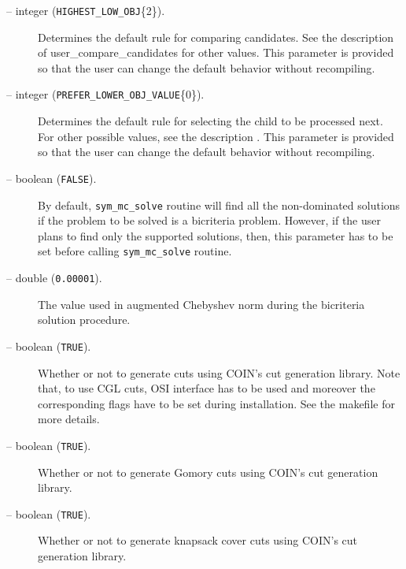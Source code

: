 \begin{description}
\item[ -- integer 
({\tt HIGHEST\_LOW\_OBJ}\{2\}).] 
Determines the default rule for comparing candidates. See the
description of 
{user_compare_candidates} for other values. This
parameter is provided so that the user can change the default behavior
without recompiling.

\item[ -- integer 
({\tt PREFER\_LOWER\_OBJ\_VALUE}\{0\}).] 
Determines the default rule for selecting the child to be processed
next. For other possible values, see the description . This
parameter is provided so that the user can change the default behavior
without recompiling.

\item[ -- boolean ({\tt FALSE}).] 
By default, {\tt sym\_mc\_solve} routine will find all the non-dominated 
solutions if the problem to be solved is 
a bicriteria problem. However, if the user plans to find only the supported 
solutions, then, this parameter has to be set before 
calling {\tt sym\_mc\_solve} routine. 

\item[ -- double ({\tt 0.00001}).] 
The value used in augmented Chebyshev norm during the bicriteria 
solution procedure.

\item[ -- boolean ({\tt TRUE}).] 
Whether or not to generate cuts using COIN's cut generation library. 
Note that, to use CGL cuts, OSI interface has to be used and moreover the 
corresponding flags have to be set during installation. See the makefile for 
more details.

\item[ -- boolean ({\tt TRUE}).] 
Whether or not to generate Gomory cuts using COIN's cut generation library. 

\item[ -- boolean ({\tt TRUE}).] 
Whether or not to generate knapsack cover cuts using COIN's cut generation 
library. 


\end{description}
